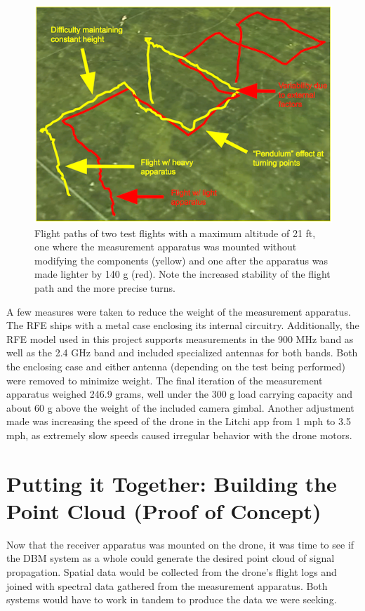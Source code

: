 \documentclass[pageno]{jpaper}
\begin{document}
 \begin{figure}[h]
 	\caption[Comparison of light paths with heavy and light apparatus]{Flight paths of two test flights with a maximum altitude of 21 ft, one where the measurement apparatus was mounted without modifying the components (yellow) and one after the apparatus was made lighter by 140 g (red). Note the increased stability of the flight path and the more precise turns. }
 	\includegraphics{performance_comparison}
 	\centering
 \end{figure}
 
 A few measures were taken to reduce the weight of the measurement apparatus. The RFE ships with a metal case enclosing its internal circuitry. Additionally, the RFE model used in this project supports measurements in the 900 MHz band as well as the 2.4 GHz band and included specialized antennas for both bands. Both the enclosing case and either antenna (depending on the test being performed) were removed to minimize weight. The final iteration of the measurement apparatus weighed 246.9 grams, well under the 300 g load carrying capacity and about 60 g above the weight of the included camera gimbal. Another adjustment made was increasing the speed of the drone in the Litchi app from 1 mph to 3.5 mph, as extremely slow speeds caused irregular behavior with the drone motors.
 
 \section{Putting it Together: Building the Point Cloud (Proof of Concept)}
Now that the receiver apparatus was mounted on the drone, it was time to see if the DBM system as a whole could generate the desired point cloud of signal propagation. Spatial data would be collected from the drone's flight logs and joined with spectral data gathered from the measurement apparatus. Both systems would have to work in tandem to produce the data we were seeking. 
\end{document}
